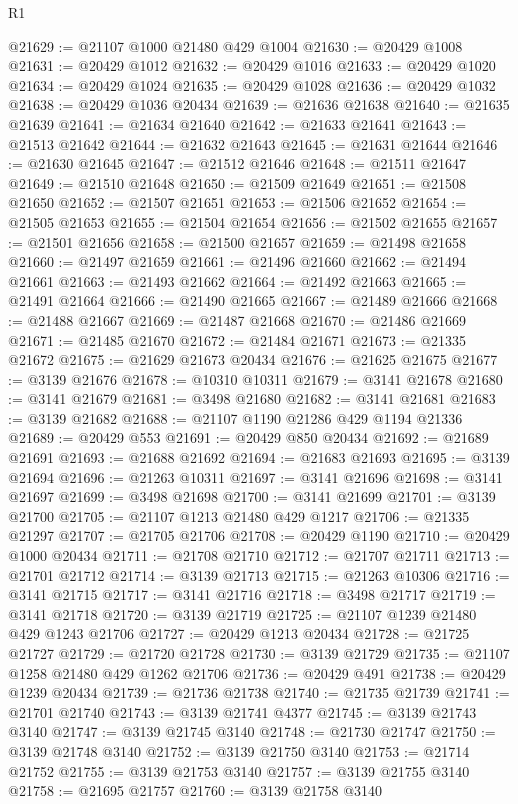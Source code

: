 \begin{lexlean}{R1}
\begin{coremodule}
@21629 := @21107 @1000 @21480 @429 @1004
@21630 := @20429 @1008
@21631 := @20429 @1012
@21632 := @20429 @1016
@21633 := @20429 @1020
@21634 := @20429 @1024
@21635 := @20429 @1028
@21636 := @20429 @1032
@21638 := @20429 @1036 @20434
@21639 := @21636 @21638
@21640 := @21635 @21639
@21641 := @21634 @21640
@21642 := @21633 @21641
@21643 := @21513 @21642
@21644 := @21632 @21643
@21645 := @21631 @21644
@21646 := @21630 @21645
@21647 := @21512 @21646
@21648 := @21511 @21647
@21649 := @21510 @21648
@21650 := @21509 @21649
@21651 := @21508 @21650
@21652 := @21507 @21651
@21653 := @21506 @21652
@21654 := @21505 @21653
@21655 := @21504 @21654
@21656 := @21502 @21655
@21657 := @21501 @21656
@21658 := @21500 @21657
@21659 := @21498 @21658
@21660 := @21497 @21659
@21661 := @21496 @21660
@21662 := @21494 @21661
@21663 := @21493 @21662
@21664 := @21492 @21663
@21665 := @21491 @21664
@21666 := @21490 @21665
@21667 := @21489 @21666
@21668 := @21488 @21667
@21669 := @21487 @21668
@21670 := @21486 @21669
@21671 := @21485 @21670
@21672 := @21484 @21671
@21673 := @21335 @21672
@21675 := @21629 @21673 @20434
@21676 := @21625 @21675
@21677 := @3139 @21676
@21678 := @10310 @10311
@21679 := @3141 @21678
@21680 := @3141 @21679
@21681 := @3498 @21680
@21682 := @3141 @21681
@21683 := @3139 @21682
@21688 := @21107 @1190 @21286 @429 @1194 @21336
@21689 := @20429 @553
@21691 := @20429 @850 @20434
@21692 := @21689 @21691
@21693 := @21688 @21692
@21694 := @21683 @21693
@21695 := @3139 @21694
@21696 := @21263 @10311
@21697 := @3141 @21696
@21698 := @3141 @21697
@21699 := @3498 @21698
@21700 := @3141 @21699
@21701 := @3139 @21700
@21705 := @21107 @1213 @21480 @429 @1217
@21706 := @21335 @21297
@21707 := @21705 @21706
@21708 := @20429 @1190
@21710 := @20429 @1000 @20434
@21711 := @21708 @21710
@21712 := @21707 @21711
@21713 := @21701 @21712
@21714 := @3139 @21713
@21715 := @21263 @10306
@21716 := @3141 @21715
@21717 := @3141 @21716
@21718 := @3498 @21717
@21719 := @3141 @21718
@21720 := @3139 @21719
@21725 := @21107 @1239 @21480 @429 @1243 @21706
@21727 := @20429 @1213 @20434
@21728 := @21725 @21727
@21729 := @21720 @21728
@21730 := @3139 @21729
@21735 := @21107 @1258 @21480 @429 @1262 @21706
@21736 := @20429 @491
@21738 := @20429 @1239 @20434
@21739 := @21736 @21738
@21740 := @21735 @21739
@21741 := @21701 @21740
@21743 := @3139 @21741 @4377
@21745 := @3139 @21743 @3140
@21747 := @3139 @21745 @3140
@21748 := @21730 @21747
@21750 := @3139 @21748 @3140
@21752 := @3139 @21750 @3140
@21753 := @21714 @21752
@21755 := @3139 @21753 @3140
@21757 := @3139 @21755 @3140
@21758 := @21695 @21757
@21760 := @3139 @21758 @3140

\end{coremodule}
\end{lexlean}

